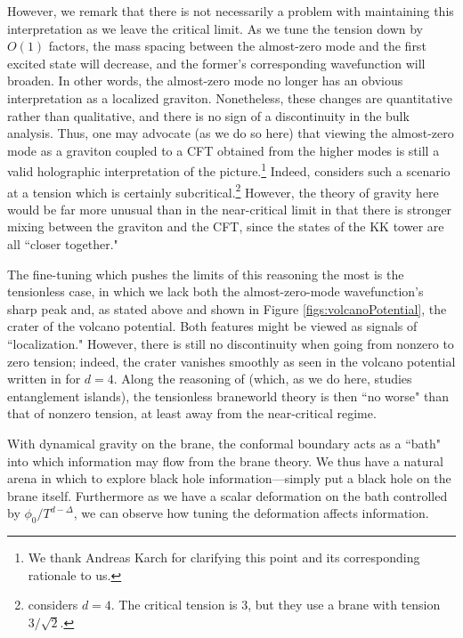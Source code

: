 \documentclass[12pt,a4paper]{article}
\newcommand{\sanjit}[1]{\textcolor{red}{\textbf{??SS:} #1}}
\begin{document}
However, we remark that there is not necessarily a problem with maintaining this interpretation as we leave the critical limit. As we tune the tension down by $O(1)$ factors, the mass spacing between the almost-zero mode and the first excited state will decrease, and the former's corresponding wavefunction will broaden. In other words, the almost-zero mode no longer has an obvious interpretation as a localized graviton. Nonetheless, these changes are quantitative rather than qualitative, and there is no sign of a discontinuity in the bulk analysis. Thus, one may advocate (as we do so here) that viewing the almost-zero mode as a graviton coupled to a CFT obtained from the higher modes is still a valid holographic interpretation of the picture.\footnote{We thank Andreas Karch for clarifying this point and its corresponding rationale to us.} Indeed, \cite{Almheiri:2019psy} considers such a scenario at a tension which is certainly subcritical.\footnote{\cite{Almheiri:2019psy} considers $d = 4$. The critical tension is $3$, but they use a brane with tension $3/\sqrt{2}$.} However, the theory of gravity here would be far more unusual than in the near-critical limit in that there is stronger mixing between the graviton and the CFT, since the states of the KK tower are all ``closer together."



The fine-tuning which pushes the limits of this reasoning the most is the tensionless case, in which we lack both the almost-zero-mode wavefunction's sharp peak and, as stated above and shown in Figure \ref{figs:volcanoPotential}, the crater of the volcano potential. Both features might be viewed as signals of ``localization." However, there is still no discontinuity when going from nonzero to zero tension; indeed, the crater vanishes smoothly as seen in the volcano potential written in \cite{Karch:2000ct} for $d = 4$. Along the reasoning of \cite{Geng:2020fxl} (which, as we do here, studies entanglement islands), the tensionless braneworld theory is then ``no worse" than that of nonzero tension, at least away from the near-critical regime.

With dynamical gravity on the brane, the conformal boundary acts as a ``bath" into which information may flow from the brane theory. We thus have a natural arena in which to explore black hole information---simply put a black hole on the brane itself. Furthermore as we have a scalar deformation on the bath controlled by $\phi_0/T^{d-\Delta}$, we can observe how tuning the deformation affects information.
\end{document}
